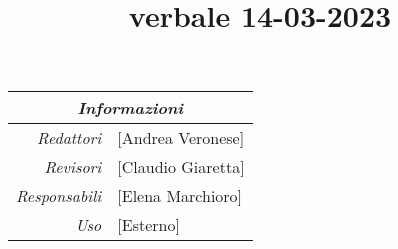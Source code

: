 \documentclass[12pt]{article}
\begin{document}
\graphicspath{ {../templates/img/} }

\title{verbale 14-03-2023}

\firstPage
\maketitle

\begin{center}
    \begin{tabular}{r | l}
		\multicolumn{2}{c}{\textit{Informazioni}}\\
		\hline
		
			\textit{Redattori} &
			[Andrea Veronese]\makecell{}\\
		
			\textit{Revisori} &
			[Claudio Giaretta]\makecell{}\\
			\textit{Responsabili} &
			[Elena Marchioro]\makecell{}\\
		      \textit{Uso} & 
                [Esterno]\makecell{}\\
\end{tabular}
\end{center}


\tableofcontents
\printindex 
\end{document}
